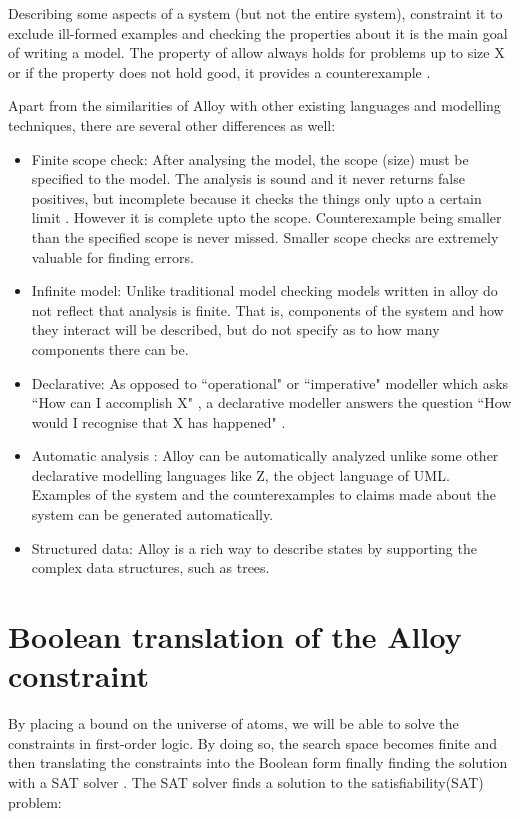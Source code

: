 \documentclass[a4paper,10pt]{report}
\begin{document}
Describing some aspects of a system (but not the entire system), constraint it to exclude ill-formed examples and checking the properties about it is the main goal of writing a model. The property of allow always holds for problems up to size X or if the property does not hold good, it provides a counterexample \cite{Yeung2005}.

Apart from the similarities of Alloy with other existing languages and modelling techniques, there are several other differences as well:
\begin{itemize}
\item Finite scope check: After analysing the model, the scope (size) must be specified to the model. The analysis is sound and it never returns false positives, but incomplete because it checks the things only upto a certain limit \cite{DanielJackson}. However it is complete upto the scope. Counterexample being smaller than the specified scope is never missed. Smaller scope checks are extremely valuable for finding errors. 
\item Infinite model: Unlike traditional model checking models written in alloy do not reflect that analysis is finite\cite{D.Jackson}. That is, components of the system and how they interact will be described, but do not specify as to how many components there can be. 
\item Declarative: As opposed to ``operational" or ``imperative" modeller which asks ``How can I accomplish X" , a declarative modeller answers the question ``How would I recognise that X has happened" \cite{DanielJackson}.
\item Automatic analysis : Alloy can be automatically analyzed unlike some other declarative modelling languages like Z, the object language of UML\cite{J.M.Spivey1989}. 
Examples of the system and the counterexamples to claims made about the system can be generated automatically.
\item Structured data: Alloy is a rich way to describe states by supporting the complex data structures, such as trees.
\end{itemize}

\section{Boolean translation of the Alloy constraint}
\label{Bool Transl}

By placing a bound on the universe of atoms, we will be able to solve the constraints in first-order logic. By doing so, the search space becomes finite and then translating the constraints into the Boolean form finally finding the solution with a SAT solver \cite{Strichman}. The SAT solver finds a solution to the satisfiability(SAT) problem: 
\end{document}

